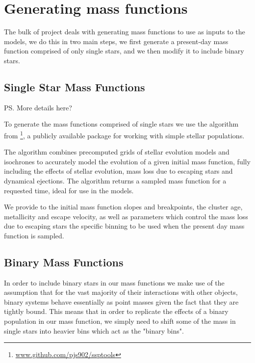 \section{Generating mass functions}

The bulk of project deals with generating mass functions to use as inputs to the 
models, we do this in two main steps, we first generate a present-day mass function comprised of
only single stars, and we then modify it to include binary stars.

\subsection{Single Star Mass Functions}

\ps{More details here?}

To generate the mass functions comprised of single stars we use the \evolvemf{} algorithm from
\footnote{\url{www.github.com/pjs902/ssptools}}, a publicly available package for
working with simple stellar populations.

The \evolvemf{} algorithm combines precomputed grids of stellar evolution models and isochrones to
accurately model the evolution of a given initial mass function, fully including the effects of stellar
evolution, mass loss due to escaping stars and dynamical ejections. The algorithm returns a sampled
mass function for a requested time, ideal for use in the  models.

We provide to \evolvemf{} the initial mass function slopes and breakpoints, the cluster age,
metallicity and escape velocity, as well as parameters which control the mass loss due to escaping
stars the specific binning to be used when the present day mass function is sampled.



\subsection{Binary Mass Functions}

In order to include binary stars in our mass functions we make use of the assumption that for the
vast majority of their interactions with other objects, binary systems behave essentially as point
masses given the fact that they are tightly bound. This means that in order to replicate the effects
of a binary population in our mass function, we simply need to shift some of the mass in single
stars into heavier bins which act as the "binary bins".


